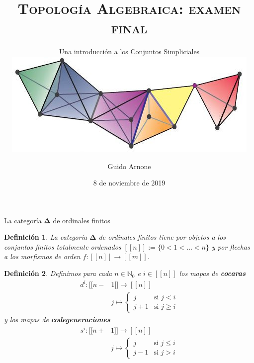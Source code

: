 \documentclass[11pt]{beamer}
\newcommand{\N}{\mathbb{N}}
\newcommand{\nat}[1]{[\![#1]\!]}
\newcommand{\ord}[1]{\nat{#1}}
\newcommand{\ordcat}{\boldsymbol{\Delta}}
\newtheorem{defs}{Definición}
\begin{document}
\author{Guido Arnone}
\title{\scshape Topología Algebraica: examen final}
\subtitle{Una introducción a los Conjuntos Simpliciales\\
\vspace{20pt}
\includegraphics[width=0.75\textheight]{portada.jpg}}
\date{8 de noviembre de 2019}
\subject{Topología Algebraica}

\begin{frame}
\titlepage
\end{frame}

\begin{frame}{La categoría $\ordcat$ de ordinales finitos}
\begin{defs} La categoría $\ordcat$ de ordinales finitos \texttt{}tiene por objetos a los conjuntos finitos totalmente ordenados $\nat{n} := \{0 < 1 < \dots < n\}$ y por flechas a los morfismos de orden $f : \nat{n} \to \nat{m}$.
\end{defs}

\begin{defs} Definimos para cada $n \in \N_0$ e $i \in \ord{n}$ los mapas de \textbf{cocaras} 
\begin{align*}
d^i : \ord{n-&1} \to \ord{n}\\
&j \mapsto \begin{cases}
j &\text{si $j < i$}\\
j+1 &\text{si $j \geq i$}
\end{cases}
\end{align*}
y los mapas de \textbf{codegeneraciones}
\begin{align*}
s^i : \ord{n+&1} \to \ord{n}\\
&j \mapsto \begin{cases}
j &\text{si $j \leq i$}\\
j-1 &\text{si $j > i$}
\end{cases}
\end{align*}
\end{defs}
\end{frame}
\end{document}
